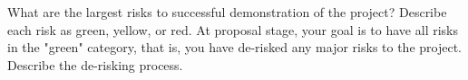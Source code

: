



What are the largest risks to successful demonstration of the project? Describe each risk as green, yellow, or red.  At proposal stage, your goal is to have all risks in the "green" category, that is, you have de-risked any major risks to the project. Describe the de-risking process.